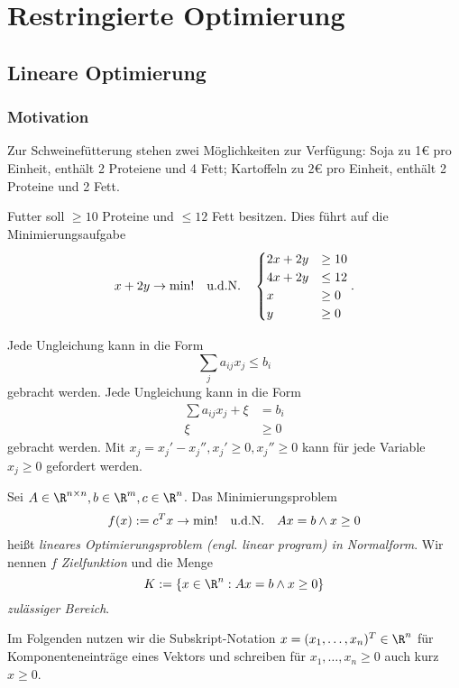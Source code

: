 \chapter{Restringierte Optimierung}



\section{Lineare Optimierung}


\subsection{Motivation}

Zur Schweinefütterung stehen zwei Möglichkeiten zur Verfügung:
 Soja zu 1€ pro Einheit, enthält 2 Proteiene und 4 Fett; Kartoffeln zu 2€ pro Einheit, enthält 2 Proteine und 2 Fett.

Futter soll $\ge 10$ Proteine und $\le 12$ Fett besitzen.
Dies führt auf die Minimierungsaufgabe
\[
	x + 2y \to \min!
	\quad\text{u.d.N.}\quad
	\begin{cases}
		2x + 2y &\ge 10 \\
		4x + 2y &\le 12 \\
		x &\ge 0 \\
		y &\ge 0
	\end{cases}.
\]


Jede Ungleichung kann in die Form
\[
	\sum_{j} a_{ij} x_j \le b_i
\]
gebracht werden.
Jede Ungleichung kann in die Form
\begin{align*}
	\sum a_{ij} x_j + \xi &= b_i \\
	\xi &\ge 0
\end{align*}
gebracht werden.
Mit $x_j = x_j' - x_j'', x_j' \ge 0, x_j'' \ge 0$
kann für jede Variable $x_j \ge 0$ gefordert werden.

\begin{df} \label{3.1}
	Sei $A \in \R^{n\times n}, b\in \R^m, c \in \R^n$.
	Das Minimierungsproblem
	\[
		f(x) := c^T x \to \min!
		\quad\text{u.d.N.}\quad
		Ax = b \land x \ge 0
	\]
	heißt \emph{lineares Optimierungsproblem (engl. linear program) in Normalform}.
	Wir nennen $f$ \emph{Zielfunktion} und die Menge
	\[
		K := \{x \in \R^n : Ax = b \land x \ge 0 \}
	\]
	\emph{zulässiger Bereich}.
\end{df}

\begin{conv*}
	Im Folgenden nutzen wir die Subskript-Notation $x = (x_1, \dotsc, x_n)^T \in \R^n$ für Komponenteneinträge eines Vektors und schreiben für $x_1, \dotsc, x_n \ge 0$ auch kurz $x \ge 0$.
\end{conv*}


